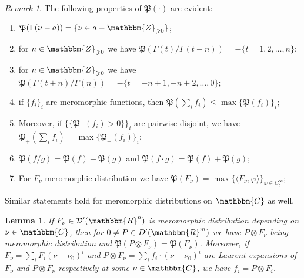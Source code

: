 \documentclass{article}
\newcommand{\nosymbol}{}
\newtheorem{lemma}[proposition]{Lemma}
\theoremstyle{remark}
\newtheorem{remark}[proposition]{Remark}
\begin{document}
\begin{remark}
  \label{P-def:rem-def-P}The following properties of $\mathfrak{P} (\cdot)$
  are evident:
  \begin{enumerate}
    \item $\mathfrak{P} (\Gamma (\nu - a)) = \{ \nu \in a
    -\mathbbm{Z}_{\geqslant 0} \}$;
    
    \item for $n \in \mathbbm{Z}_{\geqslant 0}$ we have $\mathfrak{P} (\Gamma
    (t) / \Gamma (t - n)) = - \{ t = 1, 2, \ldots, n \}$;
    
    \item for $n \in \mathbbm{Z}_{\geqslant 0}$ we have $\mathfrak{P} (\Gamma
    (t + n) / \Gamma (n)) = - \{ t = - n + 1, - n + 2, \ldots, 0 \}$;
    
    \item if $\{ f_i \}_i$ are meromorphic functions, then $\mathfrak{P}
    \left( \sum_i f_i \right) \leqslant \max \{ \mathfrak{P} (f_i) \}_i
    \nosymbol$;
    
    \item Moreover, if $\{ \{ \mathfrak{P}_+ (f_i) > 0 \} \}_i$ are pairwise
    disjoint, we have $\mathfrak{P}_+ \left( \sum_i f_i \right) = \max \{
    \mathfrak{P}_+ (f_i) \}_i \nosymbol$;
    
    \item $\mathfrak{P} (f / g) =\mathfrak{P} (f) -\mathfrak{P} (g)$ and
    $\mathfrak{P} (f \cdot g) =\mathfrak{P} (f) +\mathfrak{P} (g)$;
    
    \item For $F_{\nu}$ meromorphic distribution we have $\mathfrak{P}
    (F_{\nu}) = \max \{ \langle F_{\nu}, \varphi \rangle \}_{\varphi \in
    C^{\infty}_c}$;
  \end{enumerate}
  Similar statements hold for meromorphic distributions on $\mathbbm{C}$ as
  well.
\end{remark}

\begin{lemma}
  \label{P-def:lem-delta-times-mero}If $F_{\nu} \in \mathcal{D}'
  (\mathbbm{R}^n)$ is meromorphic distribution depending on $\nu \in
  \mathbbm{C}$, then for $0 \neq P \in D' (\mathbbm{R}^m)$ we have $P \otimes
  F_{\nu}$ being meromorphic distribution and $\mathfrak{P} (P \otimes
  F_{\nu}) =\mathfrak{P} (F_{\nu})$. Moreover, if $F_{\nu} = \sum_i F_i (\nu -
  \nu_0)^i$ and $P \otimes F_{\nu} = \sum_i f_i \cdot (\nu - \nu_0)^i$ are
  Laurent expansions of $F_{\nu}$ and $P \otimes F_{\nu}$ respectively at some
  $\nu \in \mathbbm{C}$, we have $f_i = P \otimes F_i$.
\end{lemma}
\end{document}
